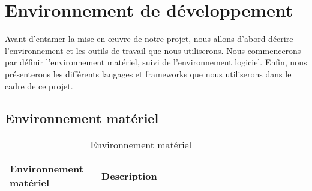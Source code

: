 \section{Environnement de développement}
Avant d'entamer la mise en œuvre de notre projet, nous allons d'abord décrire l'environnement et les outils de travail que nous utiliserons. Nous commencerons par définir l'environnement matériel, suivi de l'environnement logiciel. Enfin, nous présenterons les différents langages et frameworks que nous utiliserons dans le cadre de ce projet.

\subsection{Environnement matériel}

\begin{longtable}{|p{0.3\linewidth}|p{0.6\linewidth}|}
  
  \caption{Environnement matériel}\label{tab:environnement_materiel}\\
      \hline
      Environnement matériel & Description \\
      \hline
      

\end{longtable}
